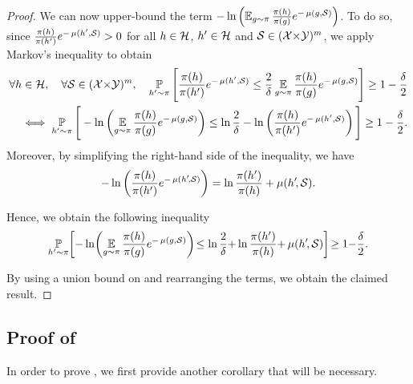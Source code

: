 \documentclass[twoside]{article}
\theoremstyle{plain}
\begin{document}
\begin{proof}
We can now upper-bound the term $-\ln\left({\textstyle\operatorname*{\mathbb{E}}_{g\sim\pi} \frac{\pi(h)}{\pi(g)}}e^{-\operatorname{\mu}(g, \mathcal{S})}\right)$.
To do so, since $\frac{\pi(h)}{\pi(h')}e^{-\operatorname{\mu}(h', \mathcal{S})} > 0$ for all $h\in\mathcal{H}$, $h'\in\mathcal{H}$ and $\mathcal{S}\in(\mathcal{X}{\times}\mathcal{Y})^{m}$, we apply Markov's inequality to obtain
\begin{align*}
    \forall h\in\mathcal{H},\quad \forall\mathcal{S}\in(\mathcal{X}{\times}\mathcal{Y})^{m},\quad \operatorname*{\mathbb{P}}_{h'\sim\pi}\Bigg[\frac{\pi(h)}{\pi(h')}e^{-\operatorname{\mu}(h', \mathcal{S})} \le \frac{2}{\delta}\operatorname*{\mathbb{E}}_{g\sim\pi}\frac{\pi(h)}{\pi(g)}e^{-\operatorname{\mu}(g, \mathcal{S})}\Bigg]\ge 1-\frac{\delta}{2}&\\
    \iff  \operatorname*{\mathbb{P}}_{h'\sim\pi}\Bigg[-\ln\left(\operatorname*{\mathbb{E}}_{g\sim\pi}\frac{\pi(h)}{\pi(g)}e^{-\operatorname{\mu}(g, \mathcal{S})}\right) \le \ln\frac{2}{\delta} -\ln\left(\frac{\pi(h)}{\pi(h')}e^{-\operatorname{\mu}(h', \mathcal{S})}\right)\Bigg]\ge 1-\frac{\delta}{2}.&
\end{align*}
Moreover, by simplifying the right-hand side of the inequality, we have 
\begin{align*}
    -\ln\left(\frac{\pi(h)}{\pi(h')}e^{-\operatorname{\mu}(h'\!, \mathcal{S})}\right) = \ln\frac{\pi(h')}{\pi(h)} +\operatorname{\mu}(h'\!, \mathcal{S}).
\end{align*}

Hence, we obtain the following inequality
\begin{align}
    \operatorname*{\mathbb{P}}_{h'\sim\pi}\!\left[ -\ln\!\left(\operatorname*{\mathbb{E}}_{g\sim\pi}\frac{\pi(h)}{\pi(g)}e^{-\operatorname{\mu}(g, \mathcal{S})}\right) \!\le \ln\frac{2}{\delta}{+}\ln\frac{\pi(h')}{\pi(h)}{+}\operatorname{\mu}(h'\!, \mathcal{S}) \right]\! \ge 1{-}\frac{\delta}{2}.\label{eq:proof-theorem-disintegrated-comp-2}
\end{align}

By using a union bound on  and rearranging the terms, we obtain the claimed result.
\end{proof}

\subsection[Proof of Corollaries 4 and 5]{Proof of }
\label{sec:proof-corollary-disintegrated-comp}

In order to prove , we first provide another corollary that will be necessary.
\end{document}
